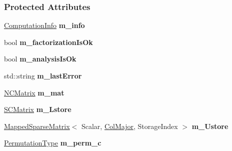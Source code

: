 \subsubsection*{Protected Attributes}
\begin{DoxyCompactItemize}
\item 
\mbox{\label{group___sparse_l_u___module_a3b8c30dd64606c6396b04c052bc88a80}} 
\hyperlink{group__enums_ga85fad7b87587764e5cf6b513a9e0ee5e}{Computation\+Info} {\bfseries m\+\_\+info}
\item 
\mbox{\label{group___sparse_l_u___module_a0f9049c98a8f53316c2ed9daa49c7db5}} 
bool {\bfseries m\+\_\+factorization\+Is\+Ok}
\item 
\mbox{\label{group___sparse_l_u___module_a9a135b7a2548570384702a3d016043f6}} 
bool {\bfseries m\+\_\+analysis\+Is\+Ok}
\item 
\mbox{\label{group___sparse_l_u___module_abc89f4bf70115b56c4eab39d7f39a88d}} 
std\+::string {\bfseries m\+\_\+last\+Error}
\item 
\mbox{\label{group___sparse_l_u___module_a0489466ddda50b9200444031544d317f}} 
\hyperlink{group___sparse_core___module}{N\+C\+Matrix} {\bfseries m\+\_\+mat}
\item 
\mbox{\label{group___sparse_l_u___module_a33a260e5b5860fa9e2a995d89f71234f}} 
\hyperlink{group___sparse_l_u___module}{S\+C\+Matrix} {\bfseries m\+\_\+\+Lstore}
\item 
\mbox{\label{group___sparse_l_u___module_afc332f9a15e95c859d6514d2e40e9a48}} 
\hyperlink{class_eigen_1_1_mapped_sparse_matrix}{Mapped\+Sparse\+Matrix}$<$ Scalar, \hyperlink{group__enums_ggaacded1a18ae58b0f554751f6cdf9eb13a0cbd4bdd0abcfc0224c5fcb5e4f6669a}{Col\+Major}, Storage\+Index $>$ {\bfseries m\+\_\+\+Ustore}
\item 
\mbox{\label{group___sparse_l_u___module_a17880d2a5075b0ad2be69e9a98b18d95}} 
\hyperlink{group___core___module}{Permutation\+Type} {\bfseries m\+\_\+perm\+\_\+c}
\item 

\end{DoxyCompactItemize}
